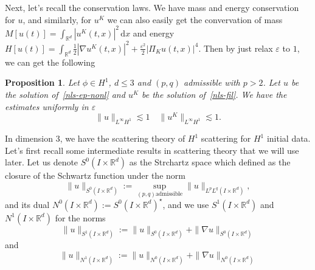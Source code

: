 \documentclass[10pt,a4paper]{article}
\newtheorem{proposition}[theorem]{Proposition}
\begin{document}
  
  Next, let's recall the conservation laws. We have mass and energy conservation
  for \(u\), and similarly, for \(u^K\) we can also easily get the convervation
  of mass \(M[u(t)] = \int_{\mathbb R^d} |u^K(t,x)|^2 \,\mathrm{d}x\) and energy
  \(H[u(t)] = \int_{\mathbb R^d} \frac12|\nabla u^K(t,x)|^2 + \frac{\varepsilon^2}2 |\Pi_K u(t,x)|^4\). 
  Then by just relax \(\varepsilon\) to \(1\), we can get the following
  \begin{proposition}
    Let \(\phi \in H^1\), \( d \leq 3 \) and \( (p,q) \) admissible with
    \( p > 2 \). Let \( u \) be the solution of~\eqref{nls-ep-nonl} and \(u^K\)
    be the solution of~\eqref{nls-fil}. We have the estimates uniformly in
    \(\varepsilon\)
    \begin{equation}\label{LinftyH1}
      \|u\|_{L^\infty H^1} \lesssim 1 \quad
      \|u^K\|_{L^\infty H^1} \lesssim 1.
    \end{equation}
  \end{proposition}
  

  In dimension \(3\), we have the scattering theory of \(H^1\) scattering for
  \(H^1\) initial data. Let's first recall some intermediate results in
  scattering theory that we will use later. Let us denote  \(S^0(I\times\mathbb R^d)\)
  as the Strchartz space which defined as the closure of the Schwartz function
  under the norm
  \[ \|u\|_{S^0(I\times\mathbb R^d)} := \sup_{(p,q) \text{admissible}}
  \|u\|_{L^p L^q(I\times\mathbb R^d)},\]
  and its dual \(N^0(I\times\mathbb R^d):= {S^0(I\times\mathbb R^d)}^{\star}\), and
  we use \(S^1(I\times\mathbb R^d)\) and \(N^1(I\times\mathbb R^d)\) for the
  norms
  \[ \|u\|_{S^1(I\times\mathbb R^d)} :=\|u\|_{S^0(I\times\mathbb R^d)} + \|\nabla u\|_{S^0(I\times\mathbb R^d)} \]
  and 
  \[ \|u\|_{N^1(I\times\mathbb R^d)} :=\|u\|_{N^0(I\times\mathbb R^d)} + \|\nabla u\|_{N^0(I\times\mathbb R^d)} \]
  
\end{document}
